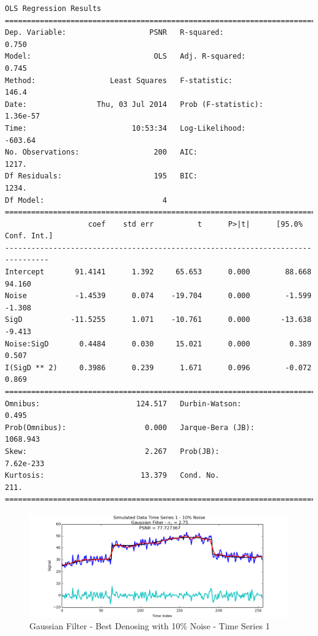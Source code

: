 \documentclass[11pt]{article}
\theoremstyle{definition}
\begin{document}
{\begin{lstlisting}[caption = Time Series 3 - Gaussian Filter OLS Model, label = {gaussianfilterseries3}]
                            OLS Regression Results                            
==============================================================================
Dep. Variable:                   PSNR   R-squared:                       0.750
Model:                            OLS   Adj. R-squared:                  0.745
Method:                 Least Squares   F-statistic:                     146.4
Date:                Thu, 03 Jul 2014   Prob (F-statistic):           1.36e-57
Time:                        10:53:34   Log-Likelihood:                -603.64
No. Observations:                 200   AIC:                             1217.
Df Residuals:                     195   BIC:                             1234.
Df Model:                           4                                         
================================================================================
                   coef    std err          t      P>|t|      [95.0% Conf. Int.]
--------------------------------------------------------------------------------
Intercept       91.4141      1.392     65.653      0.000        88.668    94.160
Noise           -1.4539      0.074    -19.704      0.000        -1.599    -1.308
SigD           -11.5255      1.071    -10.761      0.000       -13.638    -9.413
Noise:SigD       0.4484      0.030     15.021      0.000         0.389     0.507
I(SigD ** 2)     0.3986      0.239      1.671      0.096        -0.072     0.869
==============================================================================
Omnibus:                      124.517   Durbin-Watson:                   0.495
Prob(Omnibus):                  0.000   Jarque-Bera (JB):             1068.943
Skew:                           2.267   Prob(JB):                    7.62e-233
Kurtosis:                      13.379   Cond. No.                         211.
==============================================================================
\end{lstlisting}
}

\begin{figure}
\centering
\includegraphics[width = 0.75 \textwidth]{GaussianSignal1Best.png}
\caption{Gaussian Filter - Best Denosing with 10\% Noise - Time Series 1}
\label{gaussian1best}
\end{figure}
\end{document}
